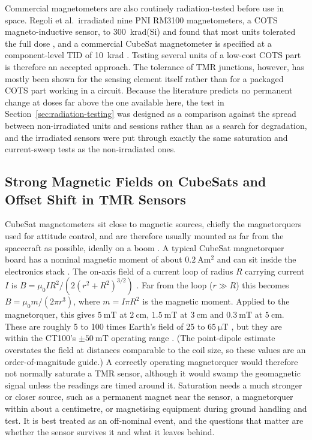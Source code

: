 \documentclass[12pt,a4paper]{article}
\begin{document}
Commercial magnetometers are also routinely radiation-tested before use in space. Regoli et al.\ irradiated nine PNI RM3100 magnetometers, a COTS magneto-inductive sensor, to \SI{300}{\kilo rad}(Si) and found that most units tolerated the full dose \cite{regoli2020}, and a commercial CubeSat magnetometer is specified at a component-level TID of \SI{10}{\kilo rad} \cite{nss_magnetometer}. Testing several units of a low-cost COTS part is therefore an accepted approach. The tolerance of TMR junctions, however, has mostly been shown for the sensing element itself rather than for a packaged COTS part working in a circuit. Because the literature predicts no permanent change at doses far above the one available here, the test in Section~\ref{sec:radiation-testing} was designed as a comparison against the spread between non-irradiated units and sessions rather than as a search for degradation, and the irradiated sensors were put through exactly the same saturation and current-sweep tests as the non-irradiated ones.

\subsection{Strong Magnetic Fields on CubeSats and Offset Shift in TMR Sensors}
\label{sec:strong-field-lit}

CubeSat magnetometers sit close to magnetic sources, chiefly the magnetorquers used for attitude control, and are therefore usually mounted as far from the spacecraft as possible, ideally on a boom \cite{nss_magnetometer}. A typical CubeSat magnetorquer board has a nominal magnetic moment of about $\SI{0.2}{\ampere\metre\squared}$ and can sit inside the electronics stack \cite{isis_imtq}. The on-axis field of a current loop of radius $R$ carrying current $I$ is $B = \mu_0 I R^2 / \left(2(r^2+R^2)^{3/2}\right)$ \cite{openstax_up2}. Far from the loop ($r \gg R$) this becomes $B = \mu_0 m / (2\pi r^3)$, where $m = I\pi R^2$ is the magnetic moment. Applied to the magnetorquer, this gives $\SI{5}{\milli\tesla}$ at $\SI{2}{\centi\metre}$, $\SI{1.5}{\milli\tesla}$ at $\SI{3}{\centi\metre}$ and $\SI{0.3}{\milli\tesla}$ at $\SI{5}{\centi\metre}$. These are roughly 5 to 100 times Earth's field of 25 to $\SI{65}{\micro\tesla}$ \cite{wmm}, but they are within the CT100's $\pm\SI{50}{\milli\tesla}$ operating range \cite{ct100_datasheet}. (The point-dipole estimate overstates the field at distances comparable to the coil size, so these values are an order-of-magnitude guide.) A correctly operating magnetorquer would therefore not normally saturate a TMR sensor, although it would swamp the geomagnetic signal unless the readings are timed around it. Saturation needs a much stronger or closer source, such as a permanent magnet near the sensor, a magnetorquer within about a centimetre, or magnetising equipment during ground handling and test. It is best treated as an off-nominal event, and the questions that matter are whether the sensor survives it and what it leaves behind.
\end{document}
